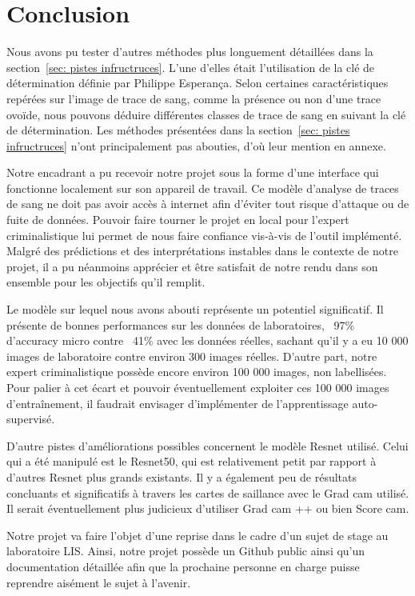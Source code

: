 \documentclass[a4paper]{article}
\begin{document}
\section{Conclusion}

Nous avons pu tester d'autres méthodes plus longuement détaillées dans la section~\ref{sec: pistes infructruces}. L'une d'elles était l'utilisation de la clé de détermination définie par Philippe Esperança. Selon certaines caractéristiques repérées sur l'image de trace de sang, comme la présence ou non d'une trace ovoïde, nous pouvons déduire différentes classes de trace de sang en suivant la clé de détermination. Les méthodes présentées dans la section~\ref{sec: pistes infructruces} n'ont principalement pas abouties, d'où leur mention en annexe.

Notre encadrant a pu recevoir notre projet sous la forme d'une interface qui fonctionne localement sur son appareil de travail. Ce modèle d'analyse de traces de sang ne doit pas avoir accès à internet afin d'éviter tout risque d'attaque ou de fuite de données. Pouvoir faire tourner le projet en local pour l'expert criminalistique lui permet de nous faire confiance vis-à-vis de l'outil implémenté. Malgré des prédictions et des interprétations instables dans le contexte de notre projet, il a pu néanmoins apprécier et être satisfait de notre rendu dans son ensemble pour les objectifs qu'il remplit.

Le modèle sur lequel nous avons abouti représente un potentiel significatif. Il présente de bonnes performances sur les données de laboratoires, ~97\% d'accuracy micro contre ~41\% avec les données réelles, sachant qu'il y a eu 10 000 images de laboratoire contre environ 300 images réelles. D'autre part, notre expert criminalistique possède encore environ 100 000 images, non labellisées. Pour palier à cet écart et pouvoir éventuellement exploiter ces 100 000 images d'entraînement, il faudrait envisager d'implémenter de l'apprentissage auto-supervisé.  

D'autre pistes d'améliorations possibles concernent le modèle Resnet utilisé. Celui qui a été manipulé est le Resnet50, qui est relativement petit par rapport à d'autres Resnet plus grands existants. Il y a également peu de résultats concluants et significatifs à travers les cartes de saillance avec le Grad cam utilisé. Il serait éventuellement plus judicieux d'utiliser Grad cam ++ ou bien Score cam. 

Notre projet va faire l'objet d'une reprise dans le cadre d'un sujet de stage au laboratoire LIS. Ainsi, notre projet possède un Github public ainsi qu'un documentation détaillée afin que la prochaine personne en charge puisse reprendre aisément le sujet à l'avenir. 
\end{document}
